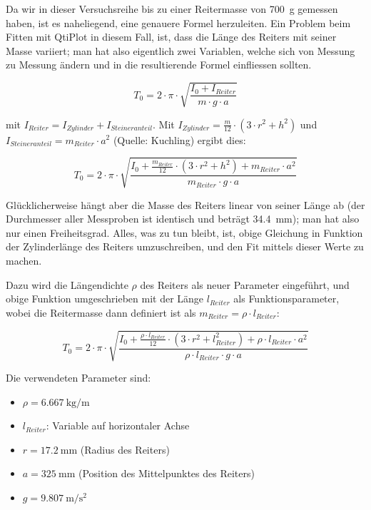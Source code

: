 Da wir  in dieser Versuchsreihe  bis zu einer Reitermasse  von \SI{700}{\gram}
gemessen  haben, ist  es  naheliegend, eine  genauere Formel  herzuleiten. Ein
Problem beim  Fitten mit  QtiPlot in  diesem Fall, ist,  dass die  L\"ange des
Reiters mit  seiner Masse  variiert; man hat  also eigentlich  zwei Variablen,
welche sich  von Messung zu Messung  \"andern und in die  resultierende Formel
einfliessen sollten.

\begin{equation}
    T_0 = 2 \cdot \pi \cdot \sqrt{\frac{I_0 + I_{Reiter}}{m \cdot g \cdot a}}
\end{equation}

mit  $I_{Reiter}  =  I_{Zylinder} +  I_{Steineranteil}$. Mit  $I_{Zylinder}  =
\frac{m}{12} \cdot (  3 \cdot r^2 + h^2)$ und  $I_{Steineranteil} = m_{Reiter}
\cdot a^2$ (Quelle: Kuchling) ergibt dies:

\begin{equation}
    T_0 = 2 \cdot \pi \cdot \sqrt{\frac{I_0 + \frac{m_{Reiter}}{12} \cdot (3\cdot r^2 + h^2) + m_{Reiter} \cdot a^2}{m_{Reiter} \cdot g \cdot a}}
\end{equation}

Gl\"ucklicherweise  h\"angt  aber die  Masse  des  Reiters linear  von  seiner
L\"ange  ab (der  Durchmesser  aller Messproben  ist  identisch und  betr\"agt
\SI{34.4}{\milli\meter}); man hat also  nur einen Freiheitsgrad. Alles, was zu
tun bleibt, ist,  obige Gleichung in Funktion der  Zylinderl\"ange des Reiters
umzuschreiben, und den Fit mittels dieser Werte zu machen.

Dazu  wird  die   L\"angendichte  $\rho$  des  Reiters   als  neuer  Parameter
eingef\"uhrt, und  obige Funktion  umgeschrieben mit der  L\"ange $l_{Reiter}$
als  Funktionsparameter,   wobei  die  Reitermasse  dann   definiert  ist  als
$m_{Reiter} = \rho \cdot l_{Reiter}$:

\begin{equation}
    T_0 = 2 \cdot \pi \cdot \sqrt{\frac{I_0 + \frac{\rho \cdot l_{Reiter}}{12} \cdot (3\cdot r^2 + l_{Reiter}^2) + \rho \cdot l_{Reiter} \cdot a^2}{\rho \cdot l_{Reiter} \cdot g \cdot a}}
\end{equation}

Die verwendeten Parameter sind:
\begin{itemize}
    \item
        $\rho = \SI{6.667}{\kilo\gram\per\meter}$
    \item
        $l_{Reiter}$: Variable auf horizontaler Achse
    \item
        $r = \SI{17.2}{\milli\meter}$ (Radius des Reiters)
    \item
        $a = \SI{325}{\milli\meter}$ (Position des Mittelpunktes des Reiters)
    \item
        $g = \SI{9.807}{\meter\per\second\squared}$
\end{itemize}


